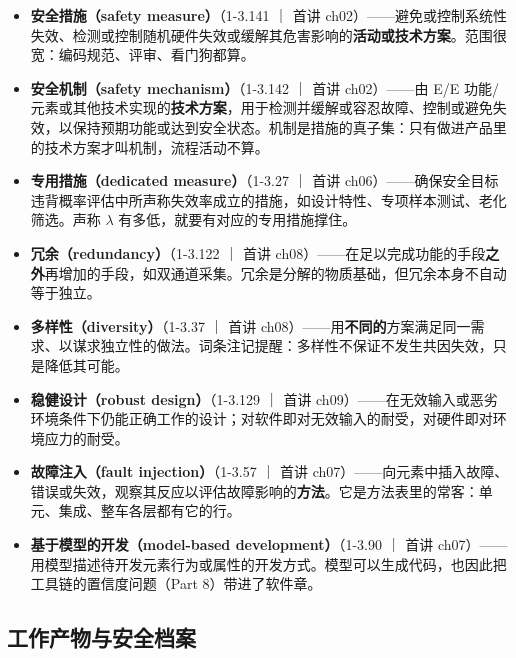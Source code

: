 \begin{itemize}
\item \textbf{安全措施（safety measure）}（1-3.141 ｜ 首讲 ch02）——避免或控制系统性失效、检测或控制随机硬件失效或缓解其危害影响的\textbf{活动或技术方案}。范围很宽：编码规范、评审、看门狗都算。
\item \textbf{安全机制（safety mechanism）}（1-3.142 ｜ 首讲 ch02）——由 E/E 功能/元素或其他技术实现的\textbf{技术方案}，用于检测并缓解或容忍故障、控制或避免失效，以保持预期功能或达到安全状态。机制是措施的真子集：只有做进产品里的技术方案才叫机制，流程活动不算。
\item \textbf{专用措施（dedicated measure）}（1-3.27 ｜ 首讲 ch06）——确保安全目标违背概率评估中所声称失效率成立的措施，如设计特性、专项样本测试、老化筛选。声称 \(\lambda\) 有多低，就要有对应的专用措施撑住。
\item \textbf{冗余（redundancy）}（1-3.122 ｜ 首讲 ch08）——在足以完成功能的手段\textbf{之外}再增加的手段，如双通道采集。冗余是分解的物质基础，但冗余本身不自动等于独立。
\item \textbf{多样性（diversity）}（1-3.37 ｜ 首讲 ch08）——用\textbf{不同的}方案满足同一需求、以谋求独立性的做法。词条注记提醒：多样性不保证不发生共因失效，只是降低其可能。
\item \textbf{稳健设计（robust design）}（1-3.129 ｜ 首讲 ch09）——在无效输入或恶劣环境条件下仍能正确工作的设计；对软件即对无效输入的耐受，对硬件即对环境应力的耐受。
\item \textbf{故障注入（fault injection）}（1-3.57 ｜ 首讲 ch07）——向元素中插入故障、错误或失效，观察其反应以评估故障影响的\textbf{方法}。它是方法表里的常客：单元、集成、整车各层都有它的行。
\item \textbf{基于模型的开发（model-based development）}（1-3.90 ｜ 首讲 ch07）——用模型描述待开发元素行为或属性的开发方式。模型可以生成代码，也因此把工具链的置信度问题（Part 8）带进了软件章。
\end{itemize}

\subsection{工作产物与安全档案}

